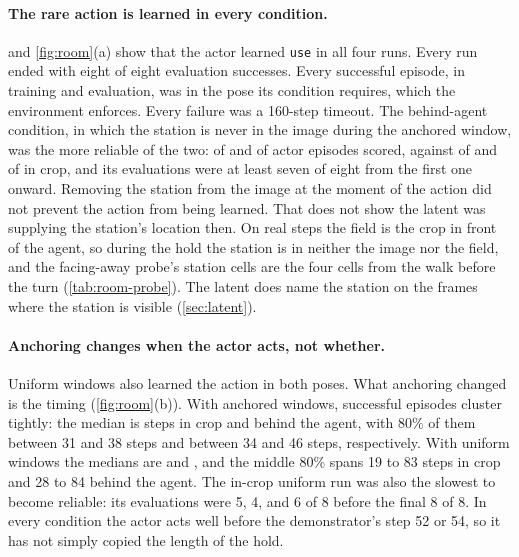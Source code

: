 \paragraph{The rare action is learned in every condition.}
 and \cref{fig:room}(a) show that the actor learned \texttt{use} in all four runs.
Every run ended with eight of eight evaluation successes.
Every successful episode, in training and evaluation, was in the pose its condition requires, which the environment enforces.
Every failure was a 160-step timeout.
The behind-agent condition, in which the station is never in the image during the anchored window, was the more reliable of the two: \RoomOutAnchoredSuccess{} of \RoomOutAnchoredActor{} and \RoomOutUniformSuccess{} of \RoomOutUniformActor{} actor episodes scored, against \RoomInAnchoredSuccess{} of \RoomInAnchoredActor{} and \RoomInUniformSuccess{} of \RoomInUniformActor{} in crop, and its evaluations were at least seven of eight from the first one onward.
Removing the station from the image at the moment of the action did not prevent the action from being learned. That does not show the latent was supplying the station's location then. On real steps the field is the crop in front of the agent, so during the hold the station is in neither the image nor the field, and the facing-away probe's station cells are the four cells from the walk before the turn (\cref{tab:room-probe}). The latent does name the station on the frames where the station is visible (\cref{sec:latent}).

\paragraph{Anchoring changes when the actor acts, not whether.}
Uniform windows also learned the action in both poses.
What anchoring changed is the timing (\cref{fig:room}(b)).
With anchored windows, successful episodes cluster tightly: the median is \RoomInAnchoredMedian{} steps in crop and \RoomOutAnchoredMedian{} behind the agent, with 80\% of them between 31 and 38 steps and between 34 and 46 steps, respectively.
With uniform windows the medians are \RoomInUniformMedian{} and \RoomOutUniformMedian{}, and the middle 80\% spans 19 to 83 steps in crop and 28 to 84 behind the agent.
The in-crop uniform run was also the slowest to become reliable: its evaluations were 5, 4, and 6 of 8 before the final 8 of 8.
In every condition the actor acts well before the demonstrator's step 52 or 54, so it has not simply copied the length of the hold.

